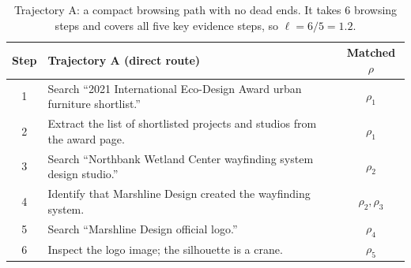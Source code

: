 \begin{table}[H]
\centering
\small
\begin{tabularx}{\textwidth}{@{}c X c@{}}
\toprule
\textbf{Step} & \textbf{Trajectory A (direct route)} & \textbf{Matched $\rho$} \\
\midrule
1 & Search ``2021 International Eco-Design Award urban furniture shortlist.''          & $\rho_1$ \\
2 & Extract the list of shortlisted projects and studios from the award page.        & $\rho_1$ \\
3 & Search ``Northbank Wetland Center wayfinding system design studio.''              & $\rho_2$ \\
4 & Identify that Marshline Design created the wayfinding system.                    & $\rho_2,\rho_3$ \\
5 & Search ``Marshline Design official logo.''                                       & $\rho_4$ \\
6 & Inspect the logo image; the silhouette is a crane.                               & $\rho_5$ \\
\bottomrule
\end{tabularx}
\caption{Trajectory A: a compact browsing path with no dead ends. It takes $6$ browsing steps and covers all five key evidence steps, so $\ell = 6/5 = 1.2$.}
\label{tab:traj-A}
\end{table}

